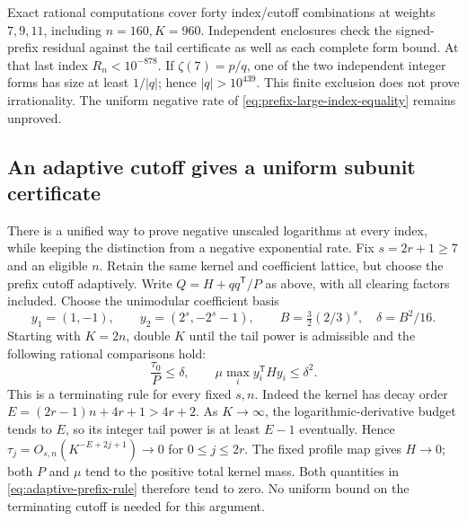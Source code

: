 \documentclass[11pt]{article}
\theoremstyle{remark}
\begin{document}
Exact rational computations cover forty index/cutoff combinations at
weights \(7,9,11\), including \(n=160,K=960\). Independent enclosures
check the signed-prefix residual against the tail certificate as well
as each complete form bound. At that last index \(R_n<10^{-878}\).
If \(\zeta(7)=p/q\), one of the two independent integer forms has size
at least \(1/|q|\); hence \(|q|>10^{439}\). This finite exclusion
does not prove irrationality. The uniform negative rate of
\eqref{eq:prefix-large-index-equality} remains unproved.

\subsection{An adaptive cutoff gives a uniform subunit certificate}
There is a unified way to prove negative unscaled logarithms at every
index, while keeping the distinction from a negative exponential rate.
Fix \(s=2r+1\ge7\) and an eligible \(n\). Retain the same kernel and
coefficient lattice, but choose the prefix cutoff adaptively. Write
\(Q=H+qq^{\mathsf T}/P\) as above, with all clearing factors included.
Choose the unimodular coefficient basis
\[
 y_1=(1,-1),\qquad y_2=(2^s,-2^s-1),\qquad
 B=\tfrac32(2/3)^s,\quad \delta=B^2/16.
\]
Starting with \(K=2n\), double \(K\) until the tail power is admissible
and the following rational comparisons hold:
\begin{equation}
 \frac{\tau_0}{P}\le\delta,\qquad
 \mu\max_i y_i^{\mathsf T}Hy_i\le\delta^2.
 \label{eq:adaptive-prefix-rule}
\end{equation}
This is a terminating rule for every fixed \(s,n\). Indeed the kernel
has decay order \(E=(2r-1)n+4r+1>4r+2\). As \(K\to\infty\),
the logarithmic-derivative budget tends to \(E\), so its integer tail
power is at least \(E-1\) eventually. Hence
\(\tau_j=O_{s,n}(K^{-E+2j+1})\to0\) for \(0\le j\le2r\).
The fixed profile map gives \(H\to0\); both \(P\) and \(\mu\) tend
to the positive total kernel mass. Both quantities in
\eqref{eq:adaptive-prefix-rule} therefore tend to zero. No uniform bound
on the terminating cutoff is needed for this argument.
\end{document}
